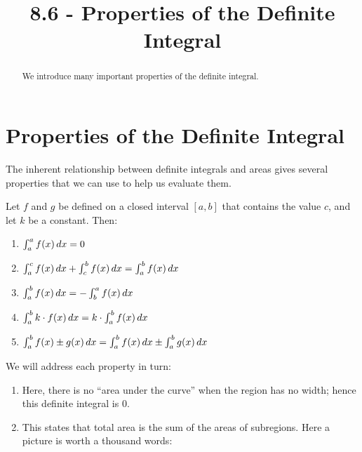 \documentclass{ximera}
\title{8.6 - Properties of the Definite Integral}
\begin{document}
\begin{abstract}
  We introduce many important properties of the definite integral.
\end{abstract}
\maketitle

\section{Properties of the Definite Integral}

The inherent relationship between definite integrals and areas gives several properties that we can use
to help us evaluate them.

\begin{theorem}
Let $f$ and $g$ be defined on a closed interval $[a,b]$ that contains the
value $c$, and let $k$ be a constant. Then:
\begin{enumerate}
	\item $\int_a^a f(x)\mathop{}\!d x = 0$
	\item $\int_a^c f(x)\mathop{}\!d x + \int_c^b f(x)\mathop{}\!d x = \int_a^b f(x)\mathop{}\!d x$
	\item $\int_a^bf(x)\mathop{}\!d x = -\int_b^a f(x)\mathop{}\!d x$
	\item $\int_a^bk\cdot f(x)\mathop{}\!d x = k\cdot\int_a^bf(x)\mathop{}\!d x$
	\item $\int_a^b f(x)\pm g(x)\mathop{}\!d x = \int_a^bf(x)\mathop{}\!d x \pm \int_a^bg(x)\mathop{}\!d x$

\end{enumerate}
\begin{explanation}
  We will address each property in turn:
\begin{enumerate}
\item Here, there is no ``area under the curve'' when the region has
  no width; hence this definite integral is $0$.
\item This states that total area is the sum of the areas of
  subregions. Here a picture is worth a thousand words:
  \begin{image}
\end{image}
\end{enumerate}
\end{explanation}
\end{theorem}
\end{document}

